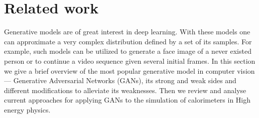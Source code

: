 

\section{Related work}
Generative models are of great interest in deep learning. With these models one can approximate a very complex distribution defined by a set of its samples. 
For example, such models can be utilized to generate a face image of a never existed person or to continue a video sequence given several initial frames. 
In this section we give a brief overview of the most popular generative model in computer vision — Generative Adversarial Networks (GANs),
 its strong and weak sides and different modifications to alleviate its weaknesses. Then we review and analyse current approaches for applying GANs to 
the simulation of calorimeters in High energy physics.

